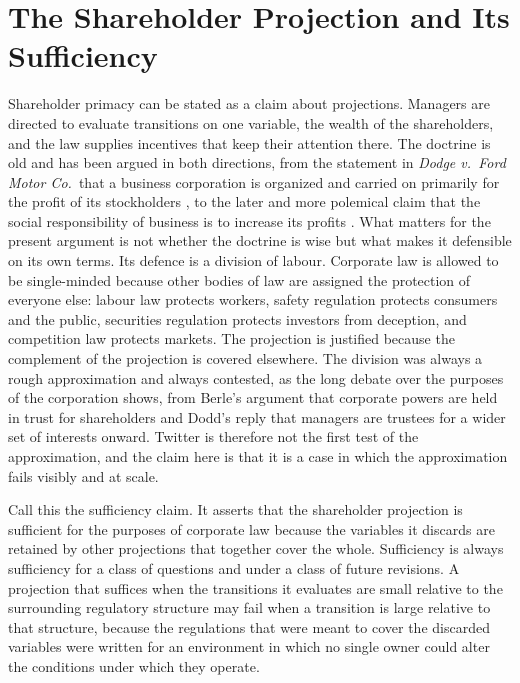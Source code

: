 \documentclass[11pt]{article}
\theoremstyle{definition}
\begin{document}
\section{The Shareholder Projection and Its Sufficiency}

Shareholder primacy can be stated as a claim about projections. Managers are directed to evaluate transitions on one variable, the wealth of the shareholders, and the law supplies incentives that keep their attention there. The doctrine is old and has been argued in both directions, from the statement in \emph{Dodge v.\ Ford Motor Co.}\ that a business corporation is organized and carried on primarily for the profit of its stockholders \cite{dodge1919}, to the later and more polemical claim that the social responsibility of business is to increase its profits \cite{friedman1970}. What matters for the present argument is not whether the doctrine is wise but what makes it defensible on its own terms. Its defence is a division of labour. Corporate law is allowed to be single-minded because other bodies of law are assigned the protection of everyone else: labour law protects workers, safety regulation protects consumers and the public, securities regulation protects investors from deception, and competition law protects markets. The projection is justified because the complement of the projection is covered elsewhere. The division was always a rough approximation and always contested, as the long debate over the purposes of the corporation shows, from Berle's argument that corporate powers are held in trust for shareholders \cite{berle1931} and Dodd's reply that managers are trustees for a wider set of interests \cite{dodd1932} onward. Twitter is therefore not the first test of the approximation, and the claim here is that it is a case in which the approximation fails visibly and at scale.

Call this the sufficiency claim. It asserts that the shareholder projection is sufficient for the purposes of corporate law because the variables it discards are retained by other projections that together cover the whole. Sufficiency is always sufficiency for a class of questions and under a class of future revisions. A projection that suffices when the transitions it evaluates are small relative to the surrounding regulatory structure may fail when a transition is large relative to that structure, because the regulations that were meant to cover the discarded variables were written for an environment in which no single owner could alter the conditions under which they operate.
\end{document}
